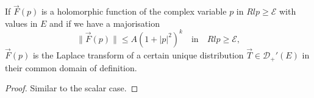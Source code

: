 \begin{prop}\label{chap9:prop9.6}
If $\overrightarrow{F}(p)$ is a holomorphic function of the complex
variable $p$ in $Rl p \geq \mathscr{E}$ with values in $E$ and if we
have a majorisation
$$
\parallel \overrightarrow{F} (p)\parallel \leq A {(1 + |p|^2)}^k
\quad \text{in} \quad Rl p \geq \mathscr{E},
$$\pageoriginale
$\overrightarrow{F}(p)$ is the Laplace transform of a certain unique
distribution $\overrightarrow{T} \in \mathscr{D}_+' (E)$ in their
common domain of definition.
\end{prop}

\begin{proof}
Similar to the scalar case.
\end{proof}
